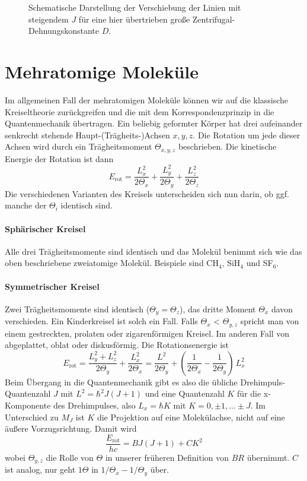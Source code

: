 \begin{figure}
\caption{Schematische Darstellung der Verschiebung der Linien mit steigendem $J$ für eine hier übertrieben große Zentrifugal-Dehnungskonstante $D$.}
\end{figure}


\section{Mehratomige Moleküle}

Im allgemeinen Fall der mehratomigen Moleküle können wir auf die klassische Kreiseltheorie zurückgreifen und die mit dem Korrespondenzprinzip in die Quantenmechanik übertragen. Ein beliebig geformter Körper hat drei aufeinander senkrecht stehende Haupt-(Trägheits-)Achsen $x,y,z$. Die Rotation um jede dieser Achsen wird durch ein Trägheitsmoment $\Theta_{x,y,z}$ beschrieben. Die kinetische Energie der Rotation ist dann
\begin{equation}
E_\text{rot} = \frac{L_x^2}{2 \Theta_x} + \frac{L_y^2}{2 \Theta_y} + \frac{L_z^2}{2 \Theta_z} 
\end{equation}
Die verschiedenen Varianten des Kreisels unterscheiden sich nun darin, ob ggf. manche der $\Theta_i$ identisch sind.

\paragraph{Sphärischer Kreisel} Alle drei Trägheitsmomente sind identisch und das Molekül benimmt sich wie das oben beschriebene zweiatomige Molekül. Beispiele sind CH$_4$, SiH$_4$ und SF$_6$.

\paragraph{Symmetrischer Kreisel} Zwei Trägheitsmomente sind identisch ($\Theta_y = \Theta_z$), das dritte Moment $\Theta_x$ davon verschieden. Ein Kinderkreisel ist solch ein Fall. Falls $\Theta_x$  < $\Theta_{y,z}$ spricht man von  einem gestreckten, prolaten oder zigarenförmigen Kreisel. Im anderen Fall von abgeplattet, oblat oder diskusförmig. Die Rotationsenergie ist
\begin{equation}
E_\text{rot} = \frac{L_y^2 + L_z^2}{2 \Theta_y} + \frac{L_x^2}{2 \Theta_x} 
= \frac{L^2 }{2 \Theta_y} + \left( \frac{1}{2 \Theta_x} - \frac{1}{2 \Theta_y} \right) \, L_x^2
\end{equation}
Beim Übergang in die Quantenmechanik gibt es also die übliche Drehimpuls-Quantenzahl $J$ mit $L^2 = \hbar^2 J (J+1)$ und eine Quantenzahl $K$ für die x-Komponente des Drehimpulses, also $L_x = \hbar K$ mit $K = 0, \pm 1, ... \pm J$. Im Unterschied zu $M_J$ ist $K$ die Projektion auf eine Molekülachse, nicht auf eine äußere Vorzugsrichtung. Damit wird 
\begin{equation}
\frac{E_\text{rot}}{hc} = B J (J + 1) + C K^2
\end{equation}
wobei $\Theta_{y,z}$ die Rolle von $\Theta$ in unserer früheren Definition von $BR$ übernimmt. $C$ ist analog, nur geht $1\Theta$ in $1/ \Theta_x - 1/ \Theta_y$ über.

